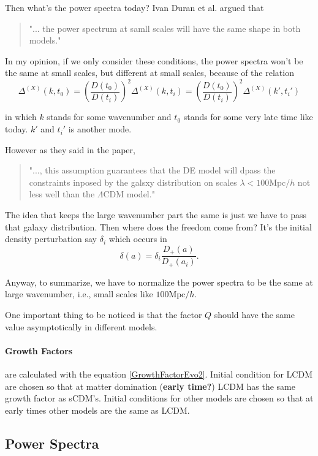 \documentclass{article}
\begin{document}
Then what's the power spectra today? Ivan Duran et al. argued that
\begin{quote}
"... the power spectrum at samll scales will have the same shape in both models."
\end{quote}

In my opinion, if we only consider these conditions, the power spectra won't be the same at small scales, but different at small scales, because of the relation
\[\Delta^{(X)}(k,t_0)=\left(\frac{D(t_0)}{D(t_i)}\right)^2\Delta^{(X)}(k,t_i)=\left(\frac{D(t_0)}{D(t_i)}\right)^2\Delta^{(X)}(k',t_i')\]

in which $k$ stands for some wavenumber and $t_0$ stands for some very late time like today. $k'$ and $t_i'$ is another mode.

However as they said in the paper,
\begin{quote}
"..., this assumption guarantees that the DE model will dpass the constraints inposed by the galsxy distribution on scales $\lambda<100\mathrm {Mpc}/h$ not less well than the $\Lambda$CDM model."
\end{quote}


The idea that keeps the large wavenumber part the same is just we have to pass that galaxy distribution. Then where does the freedom come from? It's the initial density perturbation say $\delta_i$ which occurs in 
\[\delta(a)=\delta_i \frac{D_+(a)}{D_+(a_i)}  .\]


Anyway, to summarize, we have to normalize the power spectra to be the same at large wavenumber, i.e., small scales like $100\mathrm{Mpc}/h$.

One important thing to be noticed is that the factor $Q$ should have the same value asymptotically in different models.


\paragraph{Growth Factors} are calculated with the equation \ref{GrowthFactorEvo2}. Initial condition for LCDM are chosen so that at matter domination ({\bf early time?}) LCDM has the same growth factor as sCDM's. Initial conditions for other models are chosen so that at early times other models are the same as LCDM.








\subsection{Power Spectra}
\end{document}
